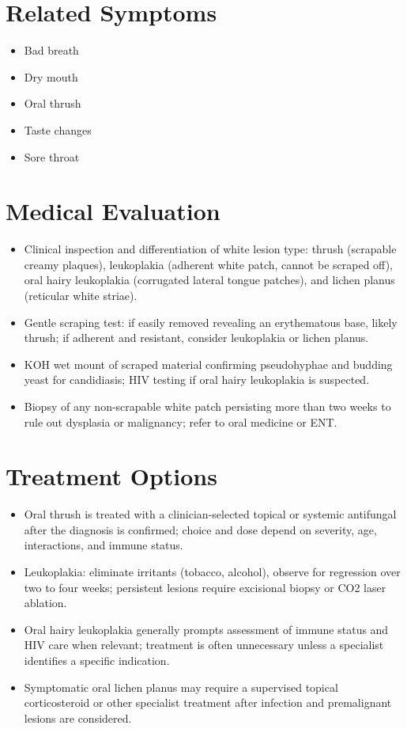 \section*{Related Symptoms}
\begin{itemize}
  \item Bad breath
  \item Dry mouth
  \item Oral thrush
  \item Taste changes
  \item Sore throat
\end{itemize}


\section*{Medical Evaluation}
\begin{itemize}
  \item Clinical inspection and differentiation of white lesion type: thrush (scrapable creamy plaques), leukoplakia (adherent white patch, cannot be scraped off), oral hairy leukoplakia (corrugated lateral tongue patches), and lichen planus (reticular white striae).
  \item Gentle scraping test: if easily removed revealing an erythematous base, likely thrush; if adherent and resistant, consider leukoplakia or lichen planus.
  \item KOH wet mount of scraped material confirming pseudohyphae and budding yeast for candidiasis; HIV testing if oral hairy leukoplakia is suspected.
  \item Biopsy of any non-scrapable white patch persisting more than two weeks to rule out dysplasia or malignancy; refer to oral medicine or ENT.
\end{itemize}

\section*{Treatment Options}
\begin{itemize}
  \item Oral thrush is treated with a clinician-selected topical or systemic antifungal after the diagnosis is confirmed; choice and dose depend on severity, age, interactions, and immune status.
  \item Leukoplakia: eliminate irritants (tobacco, alcohol), observe for regression over two to four weeks; persistent lesions require excisional biopsy or CO2 laser ablation.
  \item Oral hairy leukoplakia generally prompts assessment of immune status and HIV care when relevant; treatment is often unnecessary unless a specialist identifies a specific indication.
  \item Symptomatic oral lichen planus may require a supervised topical corticosteroid or other specialist treatment after infection and premalignant lesions are considered.
\end{itemize}

